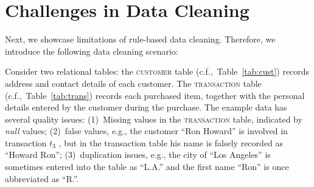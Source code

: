 \section{Challenges in Data Cleaning}
\label{sec:frontiers}

Next, we showcase limitations of rule-based data cleaning. Therefore, we introduce the following data cleaning scenario:
\label{sec:example}
\begin{table}[h]\footnotesize
\scriptsize
{}
\vspace{-1em}
\caption{\textsc{customer} table (with errors)}
\label{tab:cust}
\end{table}

\begin{table}[h]\footnotesize
\scriptsize
{}
\vspace{-1em}
\caption{\textsc{transaction} table (with errors)}
\label{tab:trans}
\end{table}


Consider two relational tables: the \textsc{customer} table (c.f.,~Table~\ref{tab:cust}) 
records address and contact details of each customer. The \textsc{transaction} table (c.f.,~Table~\ref{tab:trans}) 
records each purchased item, together with the personal details entered by the customer during the purchase. 
The example data has several quality issues: (1)~Missing values in the \textsc{transaction} table, indicated by \emph{null} values; (2)~false values, e.g.,  the customer ``Ron Howard'' is involved in transaction $t_3$ , but in the transaction table his name is falsely recorded as ``Howard Ron''; (3)~duplication issues, e.g., the city of ``Los Angeles'' is sometimes entered into the table as ``L.A.'' and the first name ``Ron'' is once abbreviated as ``R.''. 

